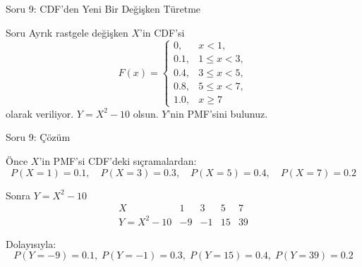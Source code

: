 \documentclass[light]{lutbeamer}
\begin{document}
\begin{frame}{Soru 9: CDF'den Yeni Bir Değişken Türetme}
\scriptsize
\begin{block}{Soru}
    Ayrık rastgele değişken $X$'in CDF'si
    \[
    F(x)=
    \begin{cases}
    0, & x<1,\\
    0.1, & 1\le x<3,\\
    0.4, & 3\le x<5,\\
    0.8, & 5\le x<7,\\
    1.0, & x\ge 7
    \end{cases}
    \]
    olarak veriliyor. $Y=X^2-10$ olsun. $Y$'nin PMF'sini bulunuz.
\end{block}
\end{frame}

\begin{frame}{Soru 9: Çözüm}
\scriptsize
\begin{block}{Önce $X$'in PMF'si}
    CDF'deki sıçramalardan:
    \[
    P(X=1)=0.1,\quad P(X=3)=0.3,\quad P(X=5)=0.4,\quad P(X=7)=0.2
    \]
\end{block}

\begin{block}{Sonra $Y=X^2-10$}
    \[
    \begin{array}{c|cccc}
    X & 1 & 3 & 5 & 7 \\ \hline
    Y=X^2-10 & -9 & -1 & 15 & 39
    \end{array}
    \]

    Dolayısıyla:
    \[
    P(Y=-9)=0.1,\;
    P(Y=-1)=0.3,\;
    P(Y=15)=0.4,\;
    P(Y=39)=0.2
    \]
\end{block}
\end{frame}
\end{document}
